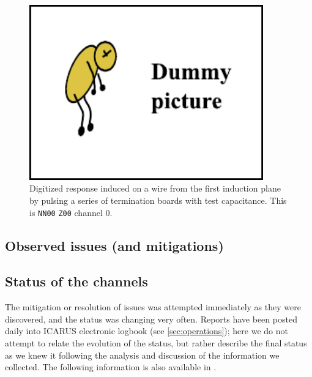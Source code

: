 \begin{figure}
  \centering
    \includegraphics[width=0.9\textwidth]{fig/dummy}
  \caption{
    Digitized response induced on a wire from the first induction plane by pulsing a series of termination boards with test capacitance.
    This is \texttt{NN00} \texttt{Z00} channel 0.
    \label{fig:TestPulseResponseTallChimney}
  }
\end{figure}


\subsection{Observed issues (and mitigations)}
\label{ssec:}



\subsection{Status of the channels}
\label{ssec:status}

The mitigation or resolution of issues was attempted immediately as they were
discovered, and the status was changing very often.
Reports have been posted daily into ICARUS electronic logbook\cite{ICARUSeLog}
(see \cref{sec:operations}); here we do not attempt to relate the evolution of
the status, but rather describe the final status as we knew it following the
analysis and discussion of the information we collected.
The following information is also available in \cite{SBNdocDB11703}.

